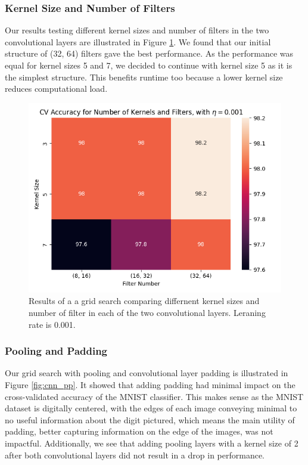 \subsubsection{Kernel Size and Number of Filters}
Our results testing different kernel sizes and number of filters in the two convolutional layers are illustrated in Figure \ref{fig:cnn_kf}. We found that our initial structure of (32, 64) filters gave the best performance. As the performance was equal for kernel sizes 5 and 7, we decided to continue with kernel size 5 as it is the simplest structure. This benefits runtime too because a lower kernel size reduces computational load.
\begin{figure}[H]
    \centering
    \includegraphics[width=\textwidth]{results/cnn_grid_search/heatmap_grid_search_kf.png}
    \caption{Results of a a grid search comparing differnent kernel sizes and number of filter in each of the two convolutional layers. Leraning rate is 0.001.}
    \label{fig:cnn_kf}
\end{figure}

\newpage
\subsubsection{Pooling and Padding}
Our grid search with pooling and convolutional layer padding is illustrated in Figure \ref{fig:cnn_pp}. It showed that adding padding had minimal impact on the cross-validated accuracy of the MNIST classifier. This makes sense as the MNIST dataset is digitally centered, with the edges of each image conveying minimal to no useful information about the digit pictured, which means the main utility of padding, better capturing information on the edge of the images, was not impactful. Additionally, we see that adding pooling layers with a kernel size of 2 after both convolutional layers did not result in a drop in performance.

